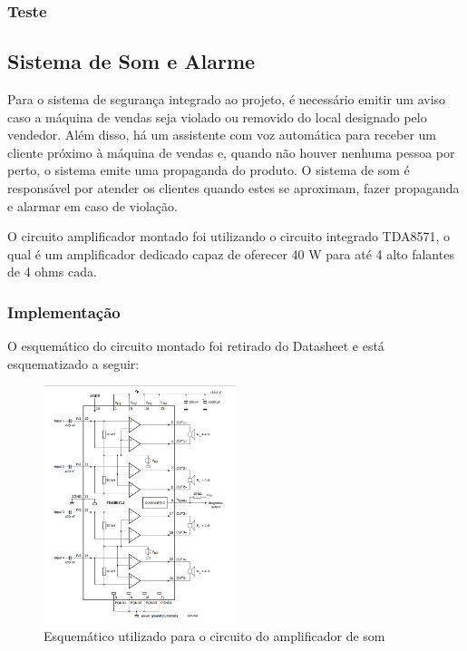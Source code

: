 \subsubsection{Teste}


\subsection{Sistema de Som e Alarme}

Para o sistema de segurança integrado ao projeto, é necessário emitir um aviso caso a máquina de vendas seja violado ou removido do local designado pelo vendedor. Além disso, há um assistente com voz automática para receber um cliente próximo à máquina de vendas e, quando não houver nenhuma pessoa por perto, o sistema emite uma propaganda do produto. O sistema de som é responsável por atender os clientes quando estes se aproximam, fazer propaganda e alarmar em caso de violação.

O circuito amplificador montado foi utilizando o circuito integrado TDA8571, o qual é um amplificador dedicado capaz de oferecer 40 W para até 4 alto falantes de 4 ohms cada.

\subsubsection{Implementação}

O esquemático do circuito montado foi retirado do Datasheet \cite{mq2} e está esquematizado a seguir:

\begin{figure}[H]
	\centering
    \includegraphics[width=0.5\textwidth]{figuras/circuito_TDA}
    \caption{Esquemático utilizado para o circuito do amplificador de som}
    \label{fig:circuito_TDA}
\end{figure}

